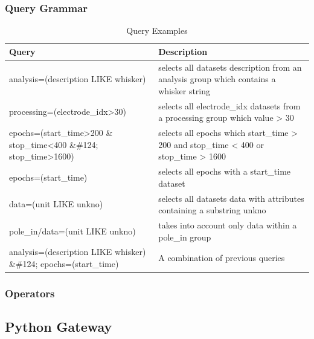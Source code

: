 \documentclass[utf8]{frontiersSCNS} %
\begin{document}
\subsubsection{Query Grammar}
\label{Query_Grammar}


\begin{table}
\caption{Query Examples}
\label{tab:query-examples}       %

\begin{tabular}{ |p{7cm}|p{9cm}| }
\hline
	 \textbf{Query}                                  &       \textbf{Description} \\ \hline
	
	 analysis=(description LIKE whisker)  &  selects all datasets description from an analysis group which contains a whisker string  \\ \hline
	 processing=(electrode\_idx>30)        &  selects all electrode\_idx datasets from a processing group which value > 30   \\ \hline
	 epochs=(start\_time>200 \& stop\_time<400 \&\#124; stop\_time>1600)  &  selects all epochs which start\_time > 200 and stop\_time < 400 or stop\_time > 1600 \\ \hline
	 epochs=(start\_time)                     &  selects all epochs with a start\_time dataset         \\ \hline
	 data=(unit LIKE unkno)  &  selects all datasets data with attributes containing a substring unkno \\ \hline
	 pole\_in/data=(unit LIKE unkno)  &  takes into account only data within a pole\_in group \\ \hline
	 analysis=(description LIKE whisker) \&\#124; epochs=(start\_time)   &  A combination of previous queries \\ \hline

\end{tabular}

\end{table}



\subsubsection{Operators}


\subsection{Python Gateway}
\label{Python_Gateway}
\end{document}
